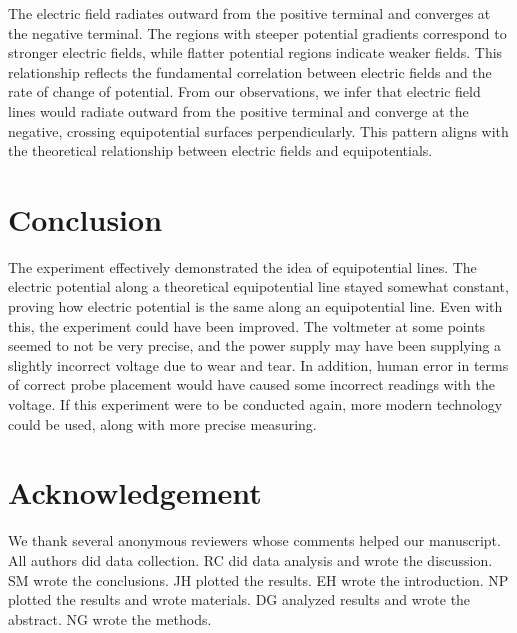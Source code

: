 \documentclass[10pt,journal,twoside]{IEEEtran}
\begin{document}
The electric field radiates outward from the positive terminal and converges at the negative terminal. The regions with steeper potential gradients correspond to stronger electric fields, while flatter potential regions indicate weaker fields. This relationship reflects the fundamental correlation between electric fields and the rate of change of potential. From our observations, we infer that electric field lines would radiate outward from the positive terminal and converge at the negative, crossing equipotential surfaces perpendicularly. This pattern aligns with the theoretical relationship \cite{ling-2016-university, tipler} between electric fields and equipotentials. 







\section{Conclusion}
The experiment effectively demonstrated the idea of equipotential lines. The electric potential along a theoretical equipotential line stayed somewhat constant, proving how electric potential is the same along an equipotential line. Even with this, the experiment could have been improved. The voltmeter at some points seemed to not be very precise, and the power supply may have been supplying a slightly incorrect voltage due to wear and tear. In addition, human error in terms of correct probe placement would have caused some incorrect readings with the voltage. If this experiment were to be conducted again, more modern technology could be used, along with more precise measuring.






\section{Acknowledgement}
We thank several anonymous reviewers whose comments helped our manuscript.  All authors did data collection. RC did data analysis and wrote the discussion. SM wrote the conclusions. JH plotted the results. EH wrote the introduction. NP plotted the results and wrote materials. DG analyzed results and wrote the abstract. NG wrote the methods.  
\end{document}
